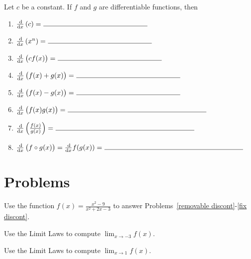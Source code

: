 \documentclass[12pt]{amsart}
\begin{document}
\begin{thm}
  Let \(c\) be a constant.
  If \(f\) and \(g\) are differentiable functions, then
  \begin{enumerate}
  \item
    \(\frac{\dif}{\dif x}\left(c\right) =\ \line(1,0){150}\)
    \vspace{.25in}
  \item
    \(\frac{\dif}{\dif x}\left(x^n\right) =\ \line(1,0){150}\)
    \vspace{.25in}
  \item
    \(\frac{\dif}{\dif x}\left(cf(x)\right) =\ \line(1,0){150}\)
    \vspace{.25in}
  \item
    \(\frac{\dif}{\dif x}\left(f(x) + g(x)\right) =\ \line(1,0){150}\)
    \vspace{.25in}
  \item
    \(\frac{\dif}{\dif x}\left(f(x) - g(x)\right) =\ \line(1,0){150}\)
    \vspace{.25in}
  \item
    \(\frac{\dif}{\dif x}\left(f(x)g(x)\right) =\ \line(1,0){200}\)
    \vspace{.25in}
  \item
    \(\frac{\dif}{\dif x}\left(\frac{f(x)}{g(x)}\right) =\ \line(1,0){200}\)
    \vspace{.25in}
  \item
    \(\frac{\dif}{\dif x}\left(f \circ g (x)\right) = \frac{\dif}{\dif x} f(g(x)) =\ \line(1,0){200}\)
  \end{enumerate}
\end{thm}

\section*{Problems}
\noindent
Use the function \(\displaystyle{f(x) = \frac{x^2 - 9}{x^2 + 2x - 3}}\) to answer Problems~\ref{removable discont}-\ref{fix discont}.

\begin{thm}[5 Points]\label{removable discont}
  Use the Limit Laws to compute \(\lim_{x \to -3} f(x)\).
\end{thm}

\vspace{2in}

\begin{thm}[5 Points]\label{infinite limit}
  Use the Limit Laws to compute \(\lim_{x \to 1} f(x)\).
\end{thm}
\end{document}
